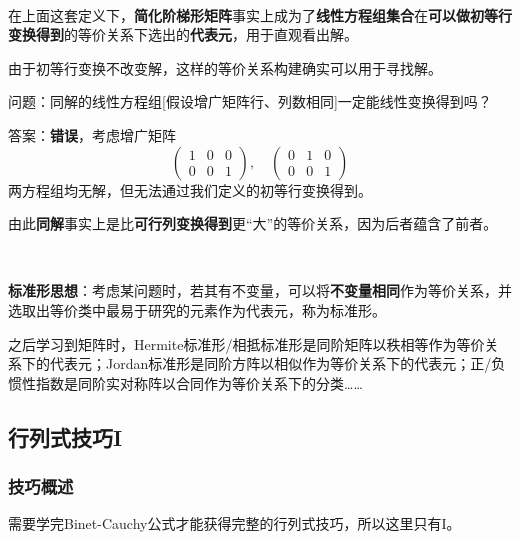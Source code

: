 \documentclass[a4paper,UTF8,fontset=windows]{ctexart}
\newcommand*{\note}{\noindent *}
\begin{document}
\

在上面这套定义下，\textbf{简化阶梯形矩阵}事实上成为了\textbf{线性方程组集合}在\textbf{可以做初等行变换得到}的等价关系下选出的\textbf{代表元}，用于直观看出解。

\note 由于初等行变换不改变解，这样的等价关系构建确实可以用于寻找解。

问题：同解的线性方程组[假设增广矩阵行、列数相同]一定能线性变换得到吗？

答案：\textbf{错误}，考虑增广矩阵
$$\begin{pmatrix}1&0&0\\0&0&1\end{pmatrix},\quad\begin{pmatrix}0&1&0\\0&0&1\end{pmatrix}$$
两方程组均无解，但无法通过我们定义的初等行变换得到。

\note 由此\textbf{同解}事实上是比\textbf{可行列变换得到}更``大''的等价关系，因为后者蕴含了前者。

\

\textbf{标准形思想}：考虑某问题时，若其有不变量，可以将\textbf{不变量相同}作为等价关系，并选取出等价类中最易于研究的元素作为代表元，称为标准形。

之后学习到矩阵时，Hermite标准形/相抵标准形是同阶矩阵以秩相等作为等价关系下的代表元；Jordan标准形是同阶方阵以相似作为等价关系下的代表元；正/负惯性指数是同阶实对称阵以合同作为等价关系下的分类……

\subsection{行列式技巧I}
\subsubsection{技巧概述}
\note 需要学完Binet-Cauchy公式才能获得完整的行列式技巧，所以这里只有I。
\end{document}
